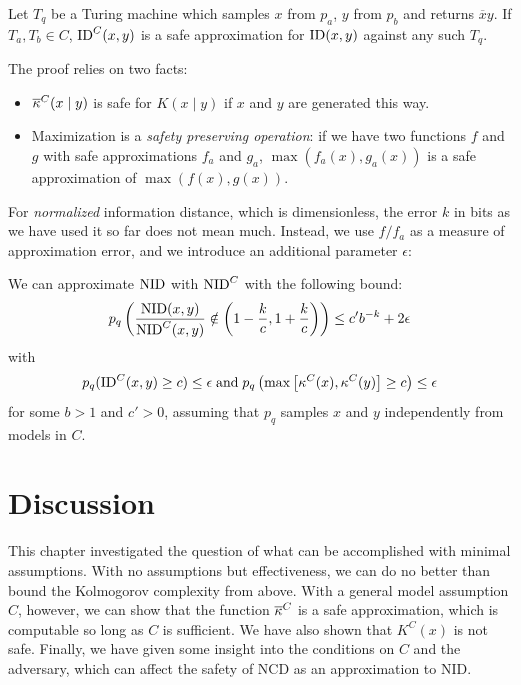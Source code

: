 \begin{theorem}\footnotemark[2]
Let $T_q$ be a Turing machine which samples $x$ from $p_a$, $y$ from $p_b$ and returns $\overline{x}y$. If $T_a, T_b \in C$, $\operatorname*{ID}^C(x, y)$ is a safe approximation for $\operatorname*{ID}(x, y)$ against any such $T_q$.
\label{theorem:safe-id}    
\end{theorem}
The proof relies on two facts:
\begin{itemize}
  \item ${\overline{\kappa}}^C(x\mid y)$ is safe for $K(x\mid y)$ if $x$ and $y$ are generated this way.
  \item  Maximization is a \emph{safety preserving operation}: if we have two functions $f$ and $g$ with safe approximations $f_a$ and $g_a$, $\max(f_a(x), g_a(x))$ is a safe approximation of $\max(f(x), g(x))$.
\end{itemize} 
For \emph{normalized} information distance, which is dimensionless, the error $k$ in bits as we have used it so far does not mean much. Instead, we use  $f/f_a$ as a measure of approximation error, and we introduce an additional parameter $\epsilon$:

\begin{theorem}\footnotemark[2]
We can approximate $\operatorname*{NID}$ with $\operatorname*{NID}^C$ with the following bound:
\[
p_q\left(\frac{\operatorname*{NID}(x, y)}{\operatorname*{NID}^C(x, y)} \notin \left (1 - \frac{k}{c}, 1 + \frac{k}{c}\right ) \right) \leq c'b^{-k} + 2\epsilon
\]
with 
\begin{align*}
p_q(\text{\textnormal{ID}}^C(x, y) \geq c) \leq \epsilon \;\text{and}\; p_q\left(\max \left[\kappa^C(x), \kappa^C(y)\right] \geq c\right) \leq \epsilon
\end{align*}
for some $b > 1$ and $c' > 0$, assuming that $p_q$ samples $x$ and $y$ independently from models in $C$.
\label{theorem:safe-nid}
\end{theorem}

\section{Discussion}

This chapter investigated the question of what can be accomplished with minimal assumptions. With no assumptions but effectiveness, we can do no better than bound the Kolmogorov complexity from above. With a general model assumption $C$, however, we can show that the function ${\overline{\kappa}}^C$ is a safe approximation, which is computable so long as $C$ is sufficient. We have also shown that $K^C(x)$ is not safe. Finally, we have given some insight into the conditions on $C$ and the adversary, which can affect the safety of NCD as an approximation to NID.

